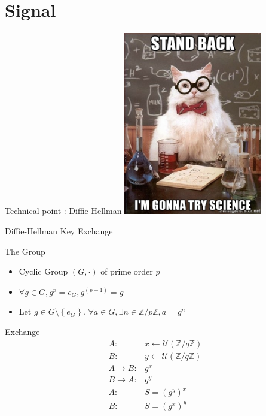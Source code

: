 \documentclass{beamer}
\newcommand{\ZZ}{\mathbb{Z}}
\newcommand{\Uu}{\mathcal{U}}
\newcommand{\la}{\leftarrow}
\newcommand{\ra}{\rightarrow}
\newcommand{\set}[1]{\left\{ #1 \right\}}
\begin{document}
\section{Signal}
\begin{frame}{Technical point : Diffie-Hellman}
	\center
	\includegraphics[height=8cm]{img/stand-back-im-gonna-try-science.jpg} 
\end{frame}

\begin{frame}{Diffie-Hellman Key Exchange}
	\begin{block}{The Group}
		\begin{itemize}
			\item Cyclic Group $(G, \cdot)$ of prime order $p$
			\item $\forall g \in G, g^p = e_G, g^{(p+1)} = g$
			\item Let $g \in G\setminus \set{e_G}$. $\forall a \in G, \exists n \in \ZZ / p\ZZ, a = g^n$
		\end{itemize}
	\end{block}

	\pause

	\begin{block}{Exchange}
	$$
    \begin{array}{rl}
      A :& x \la \Uu(\ZZ / q\ZZ) \\
      B :& y \la \Uu(\ZZ / q\ZZ) \\
      A \ra B :& g^x \\
      B \ra A :& g^y \\
      A :& S = (g^y)^x \\
      B :& S = (g^x)^y \\
    \end{array}
   $$
	\end{block}

\end{frame}
\end{document}
